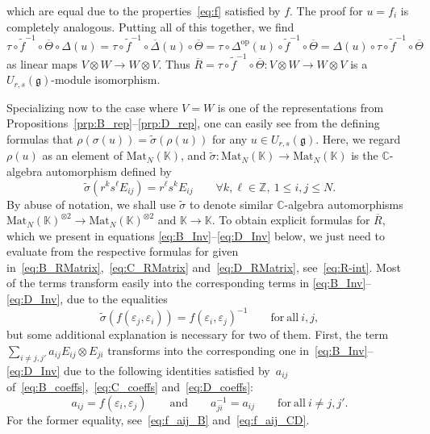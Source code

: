 \documentclass[10pt,a4paper]{amsart}
\numberwithin{equation}{section}
\DeclareMathOperator{\op}{op}
\newcommand{\fg}{\mathfrak{g}}
\newcommand{\BZ}{\mathbb{Z}}
\newcommand{\BC}{\mathbb{C}}
\newcommand{\uu}{U_{r,s}(\fg)}
\begin{document}
which are equal due to the properties~\eqref{eq:f} satisfied by $f$. The proof for $u = f_{i}$ is completely analogous. Putting all of this together, we find
\begin{displaymath}
 \tau \circ \widetilde{f}^{-1} \circ \overline{\Theta} \circ \Delta(u) =
 \tau \circ \widetilde{f}^{-1} \circ \overline{\Delta}(u)\circ \overline{\Theta} =
 \tau \circ \Delta^{\op}(u) \circ \widetilde{f}^{-1}\circ \overline{\Theta} =
 \Delta(u) \circ \tau \circ \widetilde{f}^{-1} \circ \overline{\Theta}
\end{displaymath}
as linear maps $V \otimes W \to W \otimes V$. Thus $\overline{R} = \tau \circ \widetilde{f}^{-1}\circ \overline{\Theta}\colon V \otimes W \to W \otimes V$ is a $\uu$-module isomorphism.

Specializing now to the case where $V = W$ is one of the representations from Propositions~\ref{prp:B_rep}--\ref{prp:D_rep}, one can easily see from the defining formulas that $\rho(\sigma(u)) = \widetilde{\sigma}(\rho(u))$ for any $u \in \uu$. Here, we regard $\rho(u)$ as an element of $\mathrm{Mat}_{N}(\mathbb{K})$, and $\widetilde{\sigma}\colon \mathrm{Mat}_{N}(\mathbb{K}) \to \mathrm{Mat}_{N}(\mathbb{K})$ is the $\mathbb{C}$-algebra automorphism defined by
\begin{displaymath}
 \widetilde{\sigma}(r^{k}s^{\ell}E_{ij}) = r^{\ell}s^{k}E_{ij} \qquad \forall k,\ell\in \BZ,\ 1\leq i,j\leq N.
\end{displaymath}
By abuse of notation, we shall use $\widetilde{\sigma}$ to denote similar $\BC$-algebra automorphisms $\mathrm{Mat}_{N}(\mathbb{K})^{\otimes 2} \to \mathrm{Mat}_{N}(\mathbb{K})^{\otimes 2}$ and $\mathbb{K}\to \mathbb{K}$. To obtain explicit formulas for $\overline{R}$, which we present in equations \eqref{eq:B_Inv}--\eqref{eq:D_Inv} below, we just need to evaluate  from the respective formulas for  given in~\eqref{eq:B_RMatrix},~\eqref{eq:C_RMatrix} and~\eqref{eq:D_RMatrix}, see~\eqref{eq:R-int}. Most of the terms transform easily into the corresponding terms in \eqref{eq:B_Inv}--\eqref{eq:D_Inv}, due to the equalities
\begin{displaymath}
 \widetilde{\sigma}(f(\varepsilon_j,\varepsilon_i))=f(\varepsilon_i,\varepsilon_j)^{-1}
 \qquad \mathrm{for\ all} \ i,j,
\end{displaymath}
but some additional explanation is necessary for two of them. First, the term $\sum_{i \neq j,j'} a_{ij}E_{ij} \otimes E_{ji}$ transforms into the corresponding one in~\eqref{eq:B_Inv}--\eqref{eq:D_Inv} due to the following identities satisfied by~$a_{ij}$ of~\eqref{eq:B_coeffs},~\eqref{eq:C_coeffs} and~\eqref{eq:D_coeffs}:
\begin{displaymath}
 a_{ij} = f(\varepsilon_{i},\varepsilon_{j}) \qquad \mathrm{and} \qquad a_{ji}^{-1} = a_{ij}
 \qquad \mathrm{for\ all} \ i \neq j,j'.
\end{displaymath}
For the former equality, see~\eqref{eq:f_aij_B} and~\eqref{eq:f_aij_CD}.
\end{document}

